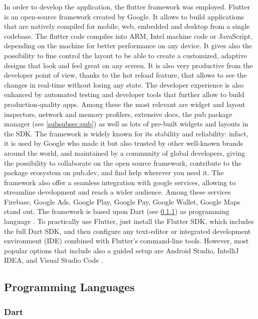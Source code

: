 In order to develop the application, the flutter framework was employed. Flutter is an open-source framework created by Google. It allows to build applications that are natively compiled for mobile, web, embedded and desktop from a single codebase. The flutter code compiles into ARM, Intel machine code or JavaScript, depending on the machine for better performance on any device. It gives also the possibility to fine control the layout to be able to create a customized, adaptive designs that look and feel great on any screen. It is also very productive from the developer point of view, thanks to the hot reload feature, that allows to see the changes in real-time without losing any state. The developer experience is also enhanced by automated testing and developer tools that further allow to build production-quality apps. Among these the most relevant are widget and layout inspectors, network and memory profilers, extensive docs, the pub package manager (see \cref{subsubsec:pub}) as well as lots of pre-built widgets and layouts in the SDK. The framework is widely known for its stability and reliability: infact, it is used by Google who made it but also trusted by other well-known brands around the world, and maintained by a community of global developers, giving the possibility to collaborate on the open source framework, contribute to the package ecosystem on pub.dev, and find help wherever you need it. The framework also offer a seamless integration with google services, allowing to streamline development and reach a wider audience. Among these services Firebase, Google Ads, Google Play, Google Pay, Google Wallet, Google Maps stand out. The framework is based upon Dart (see \cref{subsubsec:dart}) as programming language \cite{Flutter}. To practically use Flutter, just install the Flutter SDK, which includes the full Dart SDK, and then configure any text-editor or integrated development environment (IDE) combined with Flutter's command-line tools. However, most popular options that include also a guided setup are Android Studio, IntelliJ IDEA, and Visual Studio Code \cite{FlutterGetStarted}.
\newpage  

\subsection{Programming Languages}
\subsubsection{Dart}
\label{subsubsec:dart}

